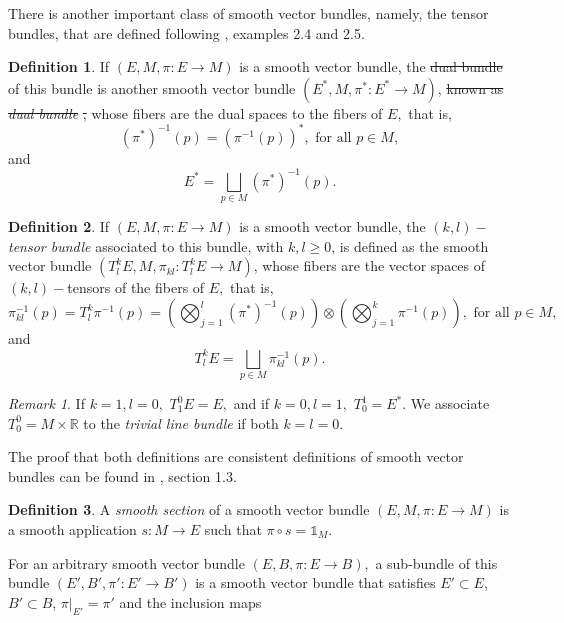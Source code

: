 \documentclass[12pt, letterpaper, reqno]{amsart}
\theoremstyle{definition}
\newtheorem{df}{Definition}
\theoremstyle{plain}
\theoremstyle{remark}
\newtheorem{rem}{Remark}
\providecommand{\DIFadd}[1]{{\protect\color{blue}\uwave{#1}}} %
\providecommand{\DIFdel}[1]{{\protect\color{red}\sout{#1}}}                      %
\providecommand{\DIFaddbegin}{} %
\providecommand{\DIFaddend}{} %
\providecommand{\DIFdelbegin}{} %
\providecommand{\DIFdelend}{} %
\newcommand{\DIFscaledelfig}{0.5}
\newlength{\DIFdelgraphicswidth} %
\newlength{\DIFdelgraphicsheight} %
\newcommand{\DIFaddincludegraphics}[2][]{{\color{blue}\fbox{\DIFOincludegraphics[#1]{#2}}}} %
\newcommand{\DIFdelincludegraphics}[2][]{%
\sbox{\DIFdelgraphicsbox}{\DIFOincludegraphics[#1]{#2}}%
\settoboxwidth{\DIFdelgraphicswidth}{\DIFdelgraphicsbox} %
\settoboxtotalheight{\DIFdelgraphicsheight}{\DIFdelgraphicsbox} %
\scalebox{\DIFscaledelfig}{%
\parbox[b]{\DIFdelgraphicswidth}{\usebox{\DIFdelgraphicsbox}\\[-\baselineskip] \rule{\DIFdelgraphicswidth}{0em}}\llap{\resizebox{\DIFdelgraphicswidth}{\DIFdelgraphicsheight}{%
\setlength{\unitlength}{\DIFdelgraphicswidth}%
\begin{picture}(1,1)%
\thicklines\linethickness{2pt} %
{\color[rgb]{1,0,0}\put(0,0){\framebox(1,1){}}}%
{\color[rgb]{1,0,0}\put(0,0){\line( 1,1){1}}}%
{\color[rgb]{1,0,0}\put(0,1){\line(1,-1){1}}}%
\end{picture}%
}\hspace*{3pt}}} %
} %
\DeclareRobustCommand{\DIFaddbegin}{\DIFOaddbegin \let\includegraphics\DIFaddincludegraphics} %
\DeclareRobustCommand{\DIFaddend}{\DIFOaddend \let\includegraphics\DIFOincludegraphics} %
\DeclareRobustCommand{\DIFdelbegin}{\DIFOdelbegin \let\includegraphics\DIFdelincludegraphics} %
\DeclareRobustCommand{\DIFdelend}{\DIFOaddend \let\includegraphics\DIFOincludegraphics} %
\begin{document}
There is another important class of smooth vector bundles, namely, the tensor bundles, that are defined following \cite{wendl2008lecture}, examples 2.4 and 2.5.
\begin{df} 
	If $ (E,M,\pi:E \rightarrow {M}) $ is a smooth vector bundle, the \DIFdelbegin \DIFdel{dual bundle }\DIFdelend \DIFaddbegin \textit{\DIFadd{dual bundle}} \DIFaddend of this bundle is another smooth vector bundle $ (E^*,M,\pi^*:E^*\rightarrow {M}) $, \DIFdelbegin \DIFdel{known as }\textit{\DIFdel{dual bundle}}%
\DIFdel{, }\DIFdelend whose fibers are the dual spaces to the fibers of $ E, $ that is,
	$$ (\pi^{*})^{-1}(p)=(\pi^{-1}(p))^*, \text{ for all }p\in M,$$ 
	and $$ E^* =\bigsqcup_{p\in M} (\pi^*)^{-1}(p). $$ 
\end{df}
\begin{df}
	If $ (E,M,\pi:E \rightarrow {M}) $ is a smooth vector bundle, the \textit{$ (k,l)- $tensor bundle} associated to this bundle, with $ k,l\geq0 $, is defined as the smooth vector bundle $ (T^k_l E, M, \pi_{kl}: T^k_l E \rightarrow {M}) $, whose fibers are the vector spaces of $ (k,l) -$tensors of the fibers of $ E, $ that is,     
	$$ \pi_{kl}^{-1}(p) = T^k_l \pi^{-1}(p)=\left( \bigotimes_{j=1}^l (\pi^{*})^{-1}(p)\right)\otimes \left( \bigotimes_{j=1}^k \pi^{-1}(p) \right), \text{ for all }p\in M, $$ 
	and
	$$ T^k_l E = \bigsqcup_{p\in M} \pi_{kl}^{-1}(p). $$ 
\end{df}
\begin{rem}
	If $ k=1,l=0, $ $T^0_1E=E,$ and if $ k=0,l=1, $ $ T^1_0=E^*. $ We associate $ T^0_0=M\times \mathbb{R} $ to the \textit{trivial line bundle} if both $ k=l=0. $ 
\end{rem}

The proof that both definitions are consistent definitions of smooth vector bundles can be found in \cite{luke2013vector}, section 1.3.
\begin{df}
	A \textit{smooth section} of a smooth vector bundle $ (E,M,\pi:E \rightarrow {M}) $ is a smooth application $ s: M \rightarrow {E} $ such that $ \pi\circ s= \mathbb{1}_{M}. $    
\end{df}
For an arbitrary smooth vector bundle $ (E,B,\pi:E \rightarrow {B}), $ a sub-bundle of this bundle $ (E',B',\pi':E' \rightarrow {B'}) $  is a smooth vector bundle that satisfies $ E'\subset E $, $ B'\subset B $, $ \pi|_{E'}=\pi' $ and the inclusion maps 
\begin{center}
\end{center}
\DIFdelbegin %
\end{document}
